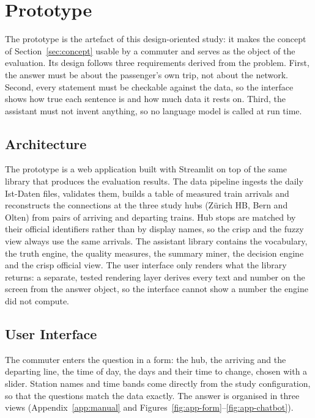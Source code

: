 \section{Prototype}
\label{sec:prototype}

The prototype is the artefact of this design-oriented study: it makes the concept of
Section~\ref{sec:concept} usable by a commuter and serves as the object of the evaluation.
Its design follows three requirements derived from the problem. First, the answer must be
about the passenger's own trip, not about the network. Second, every statement must be
checkable against the data, so the interface shows how true each sentence is and how much
data it rests on. Third, the assistant must not invent anything, so no language model is
called at run time.

\subsection{Architecture}
\label{sec:architecture}
The prototype is a web application built with Streamlit on top of the same library that
produces the evaluation results. The data pipeline ingests the daily Ist-Daten files,
validates them, builds a table of measured train arrivals and reconstructs the connections
at the three study hubs (Zürich HB, Bern and Olten) from pairs of arriving and departing
trains. Hub stops are matched by their official identifiers rather than by display names, so
the crisp and the fuzzy view always use the same arrivals. The assistant library contains
the vocabulary, the truth engine, the quality measures, the summary miner, the decision
engine and the crisp official view. The user interface only renders what the library
returns: a separate, tested rendering layer derives every text and number on the screen from
the answer object, so the interface cannot show a number the engine did not compute.

\subsection{User Interface}
\label{sec:ui}
The commuter enters the question in a form: the hub, the arriving and the departing line, the
time of day, the days and their time to change, chosen with a slider. Station names and time
bands come directly from the study configuration, so that the questions match the data
exactly. The answer is organised in three views (Appendix~\ref{app:manual} and
Figures~\ref{fig:app-form}--\ref{fig:app-chatbot}).

